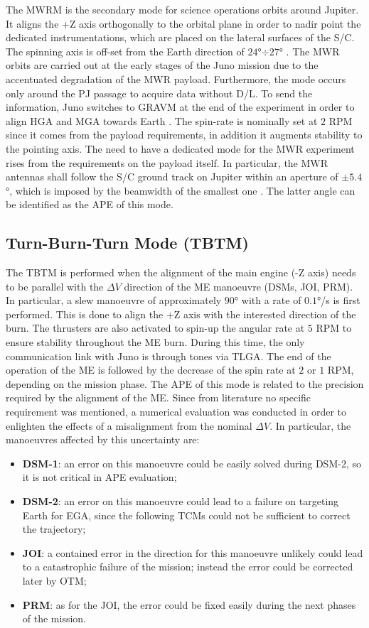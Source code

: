 The MWRM is the secondary mode for science operations orbits around Jupiter. It aligns the +Z axis orthogonally to the orbital plane in order to nadir point the dedicated instrumentations, which are placed on the lateral surfaces of the S/C. 
The spinning axis is off-set from the Earth direction of $24$°$\div$$27$° \cite{shadan}.
The MWR orbits are carried out at the early stages of the Juno mission due to the accentuated degradation of the MWR payload. Furthermore, the mode occurs only around the PJ passage to acquire data without D/L.
To send the information, Juno switches to GRAVM at the end of the experiment in order to align HGA and MGA towards Earth \cite{stuart}.
The spin-rate is nominally set at $2$ RPM since it comes from the payload requirements, in addition it augments stability to the pointing axis. 
The need to have a dedicated mode for the MWR experiment rises from the requirements on the payload itself.
In particular, the MWR antennas shall follow the S/C ground track on Jupiter within an aperture of $\pm 5.4$°, which is imposed by the beamwidth of the smallest one \cite{mwr}.
The latter angle can be identified as the APE of this mode.

\subsection{Turn-Burn-Turn Mode (TBTM)}
\label{subsec:tbt_mode}

The TBTM is performed when the alignment of the main engine (-Z axis) needs to be parallel with the $\Delta V$ direction of the ME manoeuvre (DSMs, JOI, PRM).
In particular, a slew manoeuvre of approximately $90$° with a rate of $0.1$°/s is first performed. This is done to align the +Z axis with the interested direction of the burn.
The thrusters are also activated to spin-up the angular rate at $5$ RPM to ensure stability throughout the ME burn. During this time, the only communication link with Juno is through tones via TLGA.
The end of the operation of the ME is followed by the decrease of the spin rate at $2$ or $1$ RPM, depending on the mission phase. The APE of this mode is related to the precision required by the alignment of the ME.
Since from literature no specific requirement was mentioned, a numerical evaluation was conducted in order to enlighten the effects of a misalignment from the nominal $\Delta V$.
In particular, the manoeuvres affected by this uncertainty are:
\begin{itemize}
    \item \textbf{DSM-1}: an error on this manoeuvre could be easily solved during DSM-2, so it is not critical in APE evaluation;
    \item \textbf{DSM-2}: an error on this manoeuvre could lead to a failure on targeting Earth for EGA, since the following TCMs could not be sufficient to correct the trajectory;
    \item \textbf{JOI}: a contained error in the direction for this manoeuvre unlikely could lead to a catastrophic failure of the mission; instead the error could be corrected later by OTM;
    \item \textbf{PRM}: as for the JOI, the error could be fixed easily during the next phases of the mission.
\end{itemize}

